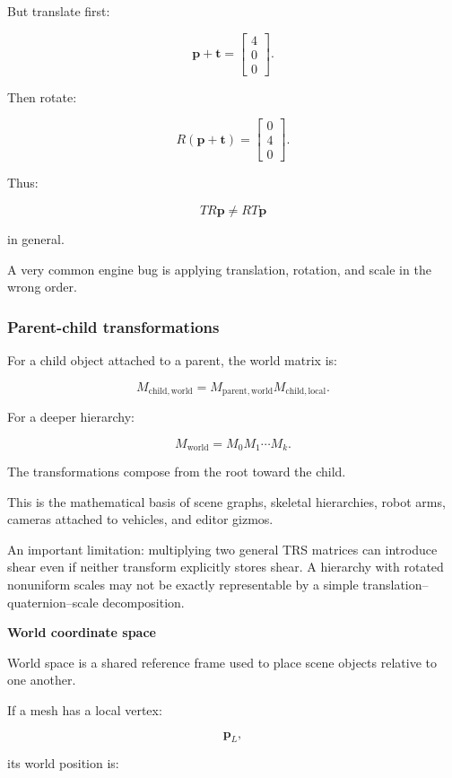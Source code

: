But translate first:

\[
 \mathbf p+\mathbf t= \begin{bmatrix}4\\0\\0\end{bmatrix}.
\]

Then rotate:

\[
 R(\mathbf p+\mathbf t)= \begin{bmatrix}0\\4\\0\end{bmatrix}.
\]

Thus:

\[
 \boxed{TR\mathbf p\ne RT\mathbf p}
\]

in general.

A very common engine bug is applying translation, rotation, and scale in the wrong order.

\subsubsection{Parent-child transformations}\label{parent-child-transformations}

For a child object attached to a parent, the world matrix is:

\[
 \boxed{ M_{\mathrm{child,world}} = M_{\mathrm{parent,world}} M_{\mathrm{child,local}} }.
\]

For a deeper hierarchy:

\[
 M_{\mathrm{world}} = M_0M_1\cdots M_k.
\]

The transformations compose from the root toward the child.

This is the mathematical basis of scene graphs, skeletal hierarchies, robot arms, cameras attached to vehicles, and editor gizmos.

An important limitation: multiplying two general TRS matrices can introduce shear even if neither transform explicitly stores shear. A hierarchy with rotated nonuniform scales may not be exactly representable by a simple translation--quaternion--scale decomposition.

\textbf{World coordinate space}

World space is a shared reference frame used to place scene objects relative to one another.

If a mesh has a local vertex:

\[
 \mathbf p_L,
\]

its world position is:

